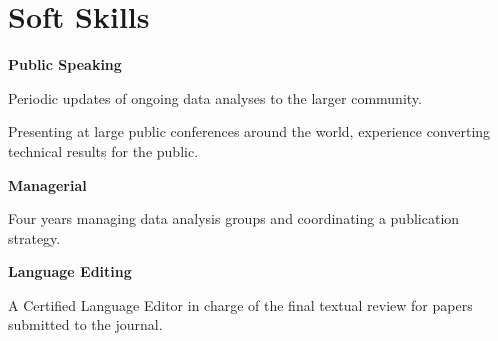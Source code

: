 \documentclass[12pt]{article}
\begin{document}
\section*{Soft Skills}
\textbf{\hspace*{0.2cm}Public Speaking}
\begin{newitemize2}
\item Periodic updates of ongoing data analyses to the larger community.
\item Presenting at large public conferences around the world, experience converting technical results for the public.\\
\end{newitemize2}
\textbf{\hspace*{0.2cm}Managerial}
\begin{newitemize2}
\item Four years managing data analysis groups and coordinating a publication strategy.\\
\end{newitemize2}
\textbf{\hspace*{0.2cm}Language Editing}
\begin{newitemize2}
 \item A Certified Language Editor in charge of the final textual review for papers submitted to the journal.\\
\end{newitemize2}
\end{document}
